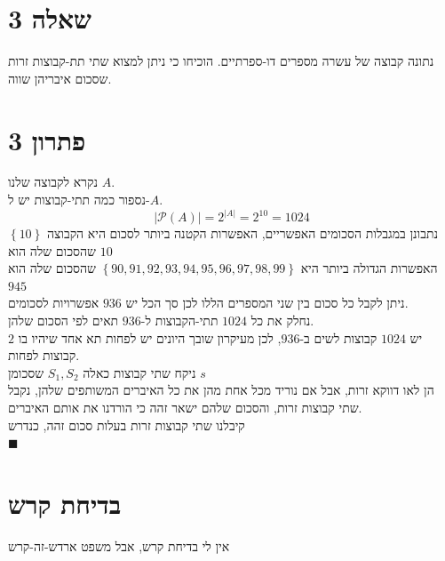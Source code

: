 \documentclass[12pt, titlepage]{article}
\begin{document}
\part*{שאלה 3}
נתונה קבוצה של עשרה מספרים דו-ספרתיים. הוכיחו כי ניתן למצוא שתי תת-קבוצות זרות שסכום איבריהן שווה.
\part*{פתרון 3}
נקרא לקבוצה שלנו $A$.\\
נספור כמה תתי-קבוצות יש ל-$A$.
\[
	\left|\mathcal{P}\left(A\right)\right| = 2^{\left|A\right|} = 2^{10} = 1024
\]
נתבונן במגבלות הסכומים האפשריים,
האפשרות הקטנה ביותר לסכום היא הקבוצה $\left\{10\right\}$ שהסכום שלה הוא $10$\\
האפשרות הגדולה ביותר היא $\left\{90,91,92,93,94,95,96,97,98,99\right\}$ שהסכום שלה הוא $945$\\
ניתן לקבל כל סכום בין שני המספרים הללו לכן סך הכל יש $936$ אפשרויות לסכומים.\\
נחלק את כל $1024$ תתי-הקבוצות ל-$936$ תאים לפי הסכום שלהן.\\
יש $1024$ קבוצות לשים ב-$936$, לכן מעיקרון שובך היונים יש לפחות תא אחד שיהיו בו $2$ קבוצות לפחות.\\
ניקח שתי קבוצות כאלה $S_1,S_2$ שסכומן $s$\\
הן לאו דווקא זרות, אבל אם נוריד מכל אחת מהן את כל האיברים המשותפים שלהן, נקבל שתי קבוצות זרות, והסכום שלהם ישאר זהה כי הורדנו את אותם האיברים.\\
קיבלנו שתי קבוצות זרות בעלות סכום זהה, כנדרש\\
$\blacksquare$
\newpage
\part*{בדיחת קרש}
אין לי בדיחת קרש, אבל משפט ארדש-זה-קרש
\end{document}
